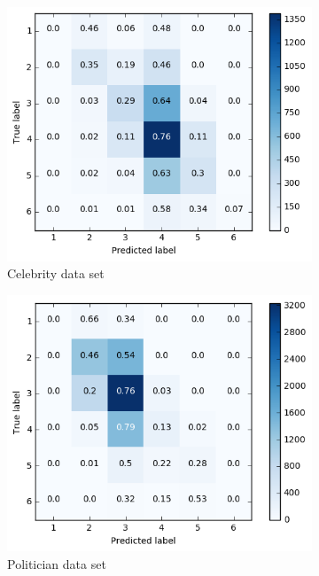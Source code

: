 \begin{figure}[h]
\centering
\begin{subfigure}{.5\textwidth}
  \centering
  \includegraphics[width=.95\linewidth]{img/celeb_lin_cm_retweets}
  \caption{Celebrity data set}
  \label{fig:retw_distr_sub1}
\end{subfigure}%
\begin{subfigure}{.5\textwidth}
  \centering
  \includegraphics[width=.95\linewidth]{img/polit_lin_cm_retweets}
  \caption{Politician data set}
  \label{fig:retw_distr_sub2}
\end{subfigure}
\begin{subfigure}{.5\textwidth}

\end{subfigure}
\end{figure}
